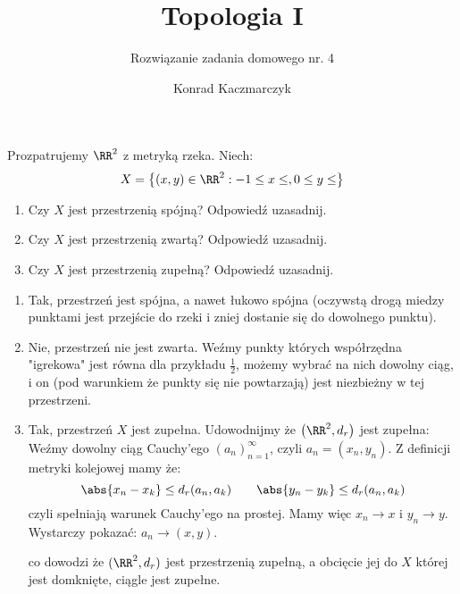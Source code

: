 \documentclass[11pt]{scrartcl}
\author{Konrad Kaczmarczyk}
\begin{document}
  \title{Topologia I}
  \subtitle{Rozwiązanie zadania domowego nr. 4}
  \maketitle

  \begin{zadanie*}
      Prozpatrujemy $\RR^2$ z metryką rzeka. Niech:
      \[
          X = \left \{ (x, y) \in \RR^2 : - 1 \leq x \leq, 0 \leq y \leq \right \}
      \]

      \begin{enumerate}
          \item Czy $X$ jest przestrzenią spójną? Odpowiedź uzasadnij.
          \item Czy $X$ jest przestrzenią zwartą? Odpowiedź uzasadnij.
          \item Czy $X$ jest przestrzenią zupełną? Odpowiedź uzasadnij.
      \end{enumerate}
  \end{zadanie*}

  \begin{enumerate}
      \item Tak, przestrzeń jest spójna, a nawet łukowo spójna (oczywstą drogą miedzy punktami jest przejście do rzeki i zniej dostanie się do dowolnego punktu).
      \item Nie, przestrzeń nie jest zwarta. Weźmy punkty których współrzędna "igrekowa" jest równa dla przykładu $\frac{1}{2}$, możemy wybrać na nich dowolny ciąg, i on (pod warunkiem że punkty się nie powtarzają) jest niezbieżny w tej przestrzeni.
      \item Tak, przestrzeń $X$ jest zupełna. Udowodnijmy że $\left ( \RR^2 , d_r \right )$ jest zupełna:
        Weźmy dowolny ciąg Cauchy'ego $(a_n)^\infty_{n=1}$, czyli $a_n = (x_n, y_n)$. Z definicji metryki kolejowej mamy że:
        \[
            \abs{x_n - x_k} \leq d_r (a_n , a_k) \qquad \abs{y_n - y_k} \leq d_r (a_n, a_k)  
        \]
        czyli spełniają warunek Cauchy'ego na prostej. Mamy więc $x_n \to x$ i $y_n \to y$. Wystarczy pokazać: $a_n \to (x, y)$.
        
        co dowodzi że $(\RR^2, d_r)$ jest przestrzenią zupełną, a obcięcie jej do $X$ której jest domknięte, ciągle jest zupełne.
        
  \end{enumerate}
  
\end{document}
